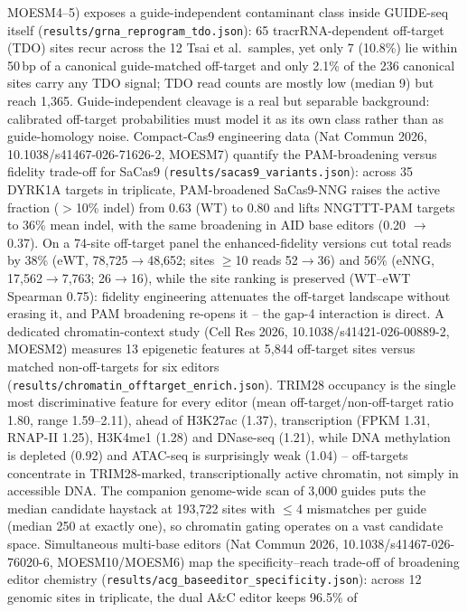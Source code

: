 \documentclass[12pt]{article}
\begin{document}
MOESM4--5) exposes a guide-independent contaminant class inside
GUIDE-seq itself (\texttt{results/grna\_reprogram\_tdo.json}): 65
tracrRNA-dependent off-target (TDO) sites recur across the 12 Tsai
et al.\ samples, yet only 7 (10.8\%) lie within 50\,bp of a
canonical guide-matched off-target and only 2.1\% of the 236
canonical sites carry any TDO signal; TDO read counts are mostly low
(median 9) but reach 1{,}365. Guide-independent cleavage is a real but
separable background: calibrated off-target probabilities must model
it as its own class rather than as guide-homology noise.
Compact-Cas9 engineering data (Nat Commun 2026,
10.1038/s41467-026-71626-2, MOESM7) quantify the PAM-broadening versus
fidelity trade-off for SaCas9 (\texttt{results/sacas9\_variants.json}):
across 35 DYRK1A targets in triplicate, PAM-broadened SaCas9-NNG raises
the active fraction ($>$10\% indel) from 0.63 (WT) to 0.80 and lifts
NNGTTT-PAM targets to 36\% mean indel, with the same broadening in
AID base editors (0.20 $\to$ 0.37). On a 74-site off-target panel the
enhanced-fidelity versions cut total reads by 38\% (eWT,
78{,}725$\to$48{,}652; sites $\geq$10 reads 52$\to$36) and 56\%
(eNNG, 17{,}562$\to$7{,}763; 26$\to$16), while the site ranking is
preserved (WT--eWT Spearman 0.75): fidelity engineering attenuates the
off-target landscape without erasing it, and PAM broadening re-opens
it -- the gap-4 interaction is direct.
A dedicated chromatin-context study (Cell Res 2026,
10.1038/s41421-026-00889-2, MOESM2) measures 13 epigenetic features at
5{,}844 off-target sites versus matched non-off-targets for six
editors (\texttt{results/chromatin\_offtarget\_enrich.json}).
TRIM28 occupancy is the single most discriminative feature for every
editor (mean off-target/non-off-target ratio 1.80, range
1.59--2.11), ahead of H3K27ac (1.37), transcription (FPKM 1.31,
RNAP-II 1.25), H3K4me1 (1.28) and DNase-seq (1.21), while DNA
methylation is depleted (0.92) and ATAC-seq is surprisingly weak
(1.04) -- off-targets concentrate in TRIM28-marked, transcriptionally
active chromatin, not simply in accessible DNA. The companion
genome-wide scan of 3{,}000 guides puts the median candidate haystack
at 193{,}722 sites with $\leq$4 mismatches per guide (median 250 at
exactly one), so chromatin gating operates on a vast candidate space.
Simultaneous multi-base editors (Nat Commun 2026,
10.1038/s41467-026-76020-6, MOESM10/MOESM6) map the
specificity--reach trade-off of broadening editor chemistry
(\texttt{results/acg\_baseeditor\_specificity.json}): across 12
genomic sites in triplicate, the dual A\&C editor keeps 96.5\% of
\end{document}
